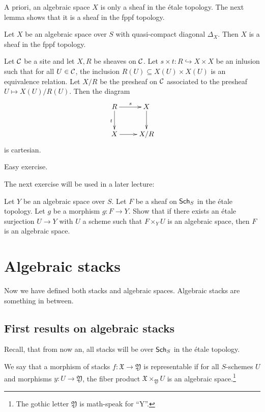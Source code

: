 \documentclass[11pt, english]{article}
\begin{document}
A priori, an algebraic space $X$ is only a sheaf in the étale topology. The next lemma shows that it is a sheaf in the fppf topology. 

\begin{lemma}
Let $X$ be an algebraic space over $S$ with quasi-compact diagonal $\Delta_X$. Then $X$ is a sheaf in the fppf topology.
\end{lemma}

\begin{exc}
Let $\mathcal{C}$ be a site and let $X,R$ be sheaves on $\mathcal{C}$. Let $s\times t: R \hookrightarrow X \times X$ be an inlusion such that for all $U \in \mathcal{C}$, the inclusion $R(U) \subseteq X(U) \times X(U)$ is an equivalence relation. Let $X/R$ be the presheaf on $\mathcal{C}$ associated to the presheaf $U \mapsto X(U)/R(U)$. Then the diagram
\[
\xymatrix{
R \ar[r]^s \ar[d]_t & X \ar[d] \\
X \ar[r] & X/R
}
\]
is cartesian.
\end{exc}
\begin{sol}
Easy exercise.
\end{sol}

The next exercise will be used in a later lecture:
\begin{exc}
\label{ex:star}
Let $Y$ be an algebraic space over $S$. Let $F$ be a sheaf on $\mathsf{Sch}_{S}$ in the étale topology. Let $g$ be a morphism $g:F \to Y$. Show that if there exists an étale surjection $U \to Y$ with $U$ a scheme such that $F \times_Y U$ is an algebraic space, then $F$ is an algebraic space.
\end{exc}
\begin{sol}
\end{sol}


 

\pagebreak
\section{Algebraic stacks}

Now we have defined both stacks and algebraic spaces. Algebraic stacks are something in between.

\subsection{First results on algebraic stacks}

Recall, that from now an, all stacks will be over $\mathsf{Sch}_{S}$ in the étale topology.

\begin{defi}
We say that a morphism of stacks $f:\mathfrak X \to \mathfrak Y$ is representable if for all  $S$-schemes $U$ and morphisms  $y:U \to \mathfrak Y$, the fiber product $\mathfrak X \times_{\mathfrak Y}  U$ is an algebraic space.\footnote{The gothic letter $\mathfrak Y$ is math-speak for ``Y''.}
\end{defi}
\end{document}
